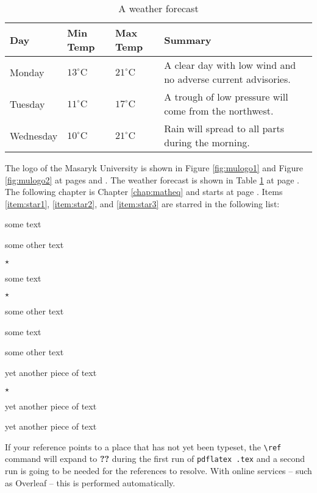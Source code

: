 \documentclass[
  color, %
  table, %
  lof,   %
  lot,   %
]{fithesis3}
\begin{document}
\begin{table}
  \begin{tabularx}{\textwidth}{lllX}
    \toprule
    Day & Min Temp & Max Temp & Summary \\
    \midrule
    Monday & $13^{\circ}\mathrm{C}$ & $21^\circ\mathrm{C}$ & A
    clear day with low wind and no adverse current advisories. \\
    Tuesday & $11^{\circ}\mathrm{C}$ & $17^\circ\mathrm{C}$ & A
    trough of low pressure will come from the northwest. \\
    Wednesday & $10^{\circ}\mathrm{C}$ &
    $21^\circ\mathrm{C}$ & Rain will spread to all parts during the
    morning. \\
    \bottomrule
  \end{tabularx}
  \caption{A weather forecast}
  \label{tab:weather}
\end{table}

The logo of the Masaryk University is shown in Figure
\ref{fig:mulogo1} and Figure \ref{fig:mulogo2} at pages
\pageref{fig:mulogo1} and \pageref{fig:mulogo2}. The weather
forecast is shown in Table \ref{tab:weather} at page
\pageref{tab:weather}. The following chapter is Chapter
\ref{chap:matheq} and starts at page \pageref{chap:matheq}.
Items \ref{item:star1}, \ref{item:star2}, and
\ref{item:star3} are starred in the following list:
\begin{compactenum}
  \item some text
  \item some other text
  \item $\star$ \label{item:star1}
  \begin{compactenum}
    \item some text
    \item $\star$ \label{item:star2}
    \item some other text
    \begin{compactenum}
      \item some text
      \item some other text
      \item yet another piece of text
      \item $\star$ \label{item:star3}
    \end{compactenum}
    \item yet another piece of text
  \end{compactenum}
  \item yet another piece of text
\end{compactenum}
If your reference points to a place that has not yet been typeset,
the \verb"\ref" command will expand to \textbf{??} during the first
run of
\texttt{pdflatex \jobname.tex}
and a second run is going to be needed for the references to
resolve. With online services -- such as Overleaf -- this is
performed automatically.
\end{document}
